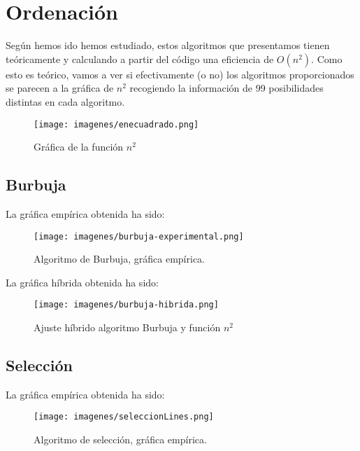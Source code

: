 \documentclass[a4paper, 11pt]{article} %
\begin{document}
\section{Ordenación} %

	
	Según hemos ido hemos estudiado, estos algoritmos que presentamos tienen teóricamente y calculando a partir del código una eficiencia de $O(n^2 )$. Como esto es teórico, vamos a ver si efectivamente (o no) los algoritmos proporcionados se parecen a la gráfica de $n^2$ recogiendo la información de 99 posibilidades distintas en cada algoritmo.
	\begin{figure}[htb]
		\centering
		\texttt{[image: imagenes/enecuadrado.png]}
		\caption{Gráfica de la función $n^2$}
		\label{fig:E1}
	\end{figure}
	


\subsection{Burbuja}

	
	La gráfica empírica obtenida ha sido:
	\begin{figure}[htb]
		\centering
		\texttt{[image: imagenes/burbuja-experimental.png]}
		\caption{Algoritmo de Burbuja, gráfica empírica.}
		\label{fig:E2}
	\end{figure}
	




	La gráfica híbrida obtenida ha sido:
	\begin{figure}[htb]
		\centering
		\texttt{[image: imagenes/burbuja-hibrida.png]}
		\caption{Ajuste híbrido algoritmo Burbuja y función $n^2$}
		\label{fig:E3}
	\end{figure}	






\subsection{Selección}

	
	La gráfica empírica obtenida ha sido:
	\begin{figure}[htb]
		\centering
		\texttt{[image: imagenes/seleccionLines.png]}
		\caption{Algoritmo de selección, gráfica empírica. }
		\label{fig:E4}
	\end{figure}
\end{document}

